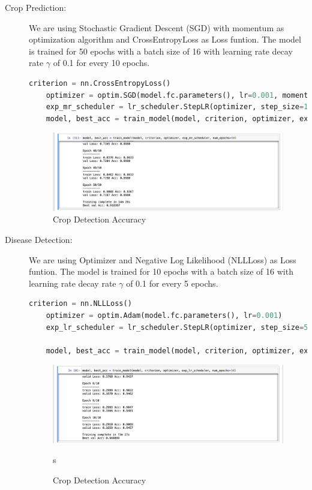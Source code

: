 \documentclass[../Report.tex]{subfiles}
\begin{document}
\begin{description}
  \item[Crop Prediction:] We are using Stochastic Gradient Descent (SGD) with momentum as optimization algorithm and CrossEntropyLoss as 
  Loss funtion. The model is trained for 50 epochs with a batch size of 16 with learning rate decay rate $\gamma$ of 0.1 for every 10 epochs.

  \begin{lstlisting}[language=python,caption={Disease Detection Image Pre-processing},captionpos=b]
    criterion = nn.CrossEntropyLoss()
    optimizer = optim.SGD(model.fc.parameters(), lr=0.001, momentum=0.9)
    exp_mr_scheduler = lr_scheduler.StepLR(optimizer, step_size=10, gamma=0.1)
    model, best_acc = train_model(model, criterion, optimizer, exp_mr_scheduler, num_epochs=50)
  \end{lstlisting}

  \begin{figure}[H]
    \centering
    \includegraphics[width=\linewidth]{images/crop_acc.png}
    \caption{Crop Detection Accuracy}
    \label{fig:crop_acc}
  \end{figure}

  \item[Disease Detection:] We are using \cite{adam} Optimizer and Negative Log Likelihood (NLLLoss) as Loss funtion. The model is trained for 
  10 epochs with a batch size of 16 with learning rate decay rate $\gamma$ of 0.1 for every 5 epochs.
  \begin{lstlisting}[language=python,caption={Disease Detection Image Pre-processing},captionpos=b]
    criterion = nn.NLLLoss()
    optimizer = optim.Adam(model.fc.parameters(), lr=0.001)
    exp_lr_scheduler = lr_scheduler.StepLR(optimizer, step_size=5, gamma=0.1)
    
    model, best_acc = train_model(model, criterion, optimizer, exp_lr_scheduler, num_epochs=10) 
  \end{lstlisting}

  \begin{figure}[H]
    \centering
    \includegraphics[width=\linewidth]{images/disease_acc.png}
    \caption{Crop Detection Accuracy}
    \label{fig:disease_acc}s
  \end{figure}


\end{description}
\end{document}
